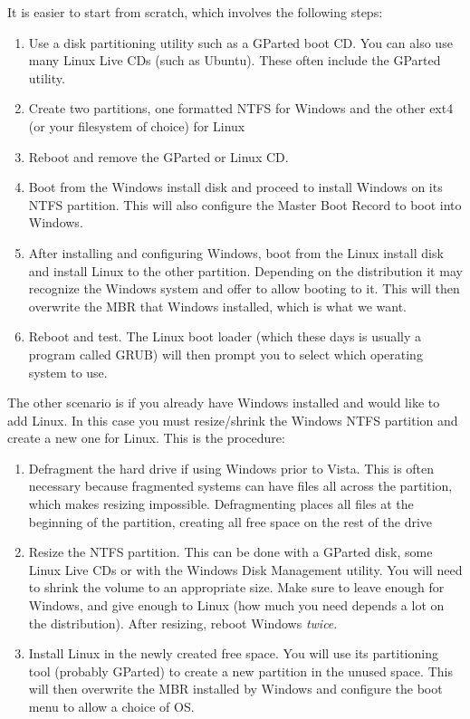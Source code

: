 It is easier to start from scratch, which involves the following steps:

\begin{enumerate}

\item
Use a disk partitioning utility such as a GParted boot CD.  You can also use many Linux Live CDs (such as Ubuntu).  These often include the GParted utility.

\item
Create two partitions, one formatted NTFS for Windows and the other ext4 (or your filesystem of choice) for Linux

\item
Reboot and remove the GParted or Linux CD.

\item
Boot from the Windows install disk and proceed to install Windows on its NTFS partition.  This will also configure the Master Boot Record to boot into Windows.

\item
After installing and configuring Windows, boot from the Linux install disk and install Linux to the other partition.  Depending on the distribution it may recognize the Windows system and offer to allow booting to it.  This will then overwrite the MBR that Windows installed, which is what we want.

\item
Reboot and test.  The Linux boot loader (which these days is usually a program called GRUB) will then prompt you to select which operating system to use.

\end{enumerate}

The other scenario is if you already have Windows installed and would like to add Linux.  In this case you must resize/shrink the Windows NTFS partition and create a new one for Linux.  This is the procedure:

\begin{enumerate}
\item
Defragment the hard drive if using Windows prior to Vista.  This is often necessary because fragmented systems can have files all across the partition, which makes resizing impossible.  Defragmenting places all files at the beginning of the partition, creating all free space on the rest of the drive

\item
Resize the NTFS partition.  This can be done with a GParted disk, some Linux Live CDs or with the Windows Disk Management utility.  You will need to shrink the volume to an appropriate size.  Make sure to leave enough for Windows, and give enough to Linux (how much you need depends a lot on the distribution).  After resizing, reboot Windows \textit{twice}.

\item
Install Linux in the newly created free space.  You will use its partitioning tool (probably GParted) to create a new partition in the unused space.  This will then overwrite the MBR installed by Windows and configure the boot menu to allow a choice of OS.
\end{enumerate}

